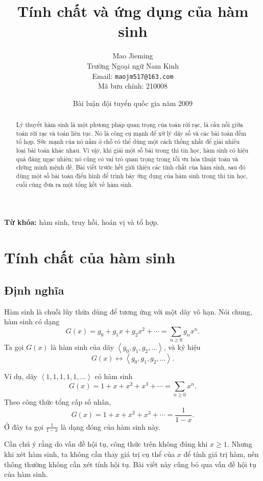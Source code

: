 \documentclass[11pt]{article}
\title{Tính chất và ứng dụng của hàm sinh}
\author{Mao Jieming\\Trường Ngoại ngữ Nam Kinh\\Email: \texttt{maojm517@163.com}\\Mã bưu chính: 210008}
\date{Bài luận đội tuyển quốc gia năm 2009}
\newcommand{\seq}[1]{\left\langle #1\right\rangle}
\begin{document}
\maketitle


\begin{abstract}
Lý thuyết hàm sinh là một phương pháp quan trọng của toán rời rạc, là cầu nối
giữa toán rời rạc và toán liên tục. Nó là công cụ mạnh để xử lý dãy số và các
bài toán đếm tổ hợp. Sức mạnh của nó nằm ở chỗ có thể dùng một cách thống
nhất để giải nhiều loại bài toán khác nhau. Vì vậy, khi giải một số bài trong
thi tin học, hàm sinh có hiệu quả đáng ngạc nhiên; nó cũng có vai trò quan
trọng trong tối ưu hóa thuật toán và chứng minh mệnh đề. Bài viết trước hết
giới thiệu các tính chất của hàm sinh, sau đó dùng một số bài toán điển hình
để trình bày ứng dụng của hàm sinh trong thi tin học, cuối cùng đưa ra một
tổng kết về hàm sinh.
\end{abstract}

\noindent\textbf{Từ khóa:} hàm sinh, truy hồi, hoán vị và tổ hợp.

\tableofcontents

\section{Tính chất của hàm sinh}

\subsection{Định nghĩa}

Hàm sinh là chuỗi lũy thừa dùng để tương ứng với một dãy vô hạn. Nói chung,
hàm sinh có dạng
\[
  G(x)=g_0+g_1x+g_2x^2+\cdots=\sum_{n\ge 0} g_n x^n.
\]
Ta gọi \(G(x)\) là hàm sinh của dãy
\(\seq{g_0,g_1,g_2,\ldots}\), và ký hiệu
\[
  G(x)\longleftrightarrow \seq{g_0,g_1,g_2,\ldots}.
\]

Ví dụ, dãy \(\seq{1,1,1,1,1,\ldots}\) có hàm sinh
\[
  G(x)=1+x+x^2+x^3+\cdots=\sum_{n\ge 0}x^n.
\]
Theo công thức tổng cấp số nhân,
\[
  G(x)=1+x+x^2+x^3+\cdots=\frac{1}{1-x}.
\]
Ở đây ta gọi \(\frac1{1-x}\) là dạng đóng của hàm sinh này.

Cần chú ý rằng do vấn đề hội tụ, công thức trên không đúng khi \(x\ge 1\).
Nhưng khi xét hàm sinh, ta không cần thay giá trị cụ thể của \(x\) để tính
giá trị hàm, nên thông thường không cần xét tính hội tụ. Bài viết này cũng bỏ
qua vấn đề hội tụ của hàm sinh.
\end{document}

